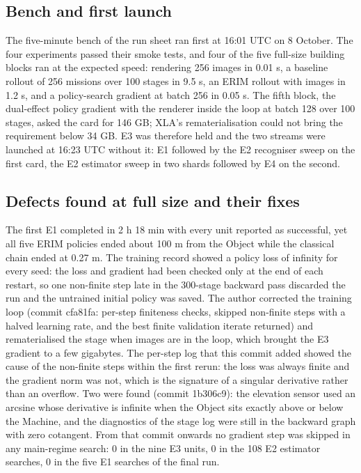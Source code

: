 \documentclass[11pt,a4paper]{article}
\begin{document}
\subsection{Bench and first launch}

The five-minute bench of the run sheet ran first at 16:01 UTC on 8 October. The four experiments passed their smoke tests, and four of the five full-size building blocks ran at the expected speed: rendering 256 images in 0.01 s, a baseline rollout of 256 missions over 100 stages in 9.5 s, an ERIM rollout with images in 1.2 s, and a policy-search gradient at batch 256 in 0.05 s. The fifth block, the dual-effect policy gradient with the renderer inside the loop at batch 128 over 100 stages, asked the card for 146 GB; XLA's rematerialisation could not bring the requirement below 34 GB. E3 was therefore held and the two streams were launched at 16:23 UTC without it: E1 followed by the E2 recogniser sweep on the first card, the E2 estimator sweep in two shards followed by E4 on the second.

\subsection{Defects found at full size and their fixes}

The first E1 completed in 2 h 18 min with every unit reported as successful, yet all five ERIM policies ended about 100 m from the Object while the classical chain ended at 0.27 m. The training record showed a policy loss of infinity for every seed: the loss and gradient had been checked only at the end of each restart, so one non-finite step late in the 300-stage backward pass discarded the run and the untrained initial policy was saved. The author corrected the training loop (commit cfa81fa: per-step finiteness checks, skipped non-finite steps with a halved learning rate, and the best finite validation iterate returned) and rematerialised the stage when images are in the loop, which brought the E3 gradient to a few gigabytes. The per-step log that this commit added showed the cause of the non-finite steps within the first rerun: the loss was always finite and the gradient norm was not, which is the signature of a singular derivative rather than an overflow. Two were found (commit 1b306c9): the elevation sensor used an arcsine whose derivative is infinite when the Object sits exactly above or below the Machine, and the diagnostics of the stage log were still in the backward graph with zero cotangent. From that commit onwards no gradient step was skipped in any main-regime search: 0 in the nine E3 units, 0 in the 108 E2 estimator searches, 0 in the five E1 searches of the final run.
\end{document}
